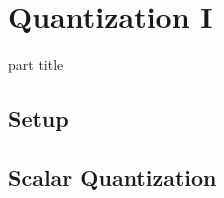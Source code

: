 \section{Quantization I} 
\begin{frame}
 \vspace{12.0ex}
\begin{center}
\begin{beamercolorbox}[sep=12pt,center]{part title}
\insertsection\par
\end{beamercolorbox}
\end{center}
\end{frame}
\subsection{Setup}




\subsection{Scalar Quantization}






